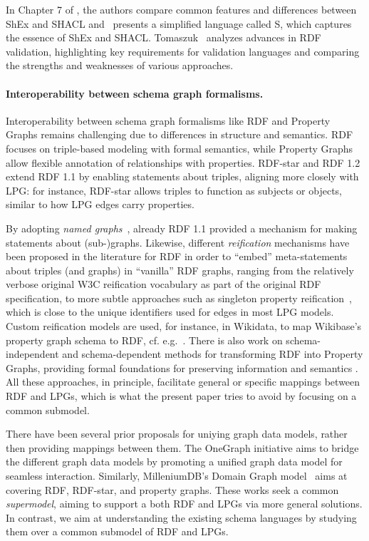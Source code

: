 In Chapter 7 of \cite{GPBK17}, the authors compare common features and differences between ShEx and SHACL and~\cite{GGFE19} presents a simplified language called S, which captures the essence of ShEx and SHACL. Tomaszuk~\cite{T17} analyzes advances in RDF validation, highlighting key requirements for validation languages and comparing the strengths and weaknesses of various approaches.

\paragraph{Interoperability between schema graph formalisms.}

Interoperability between schema graph formalisms like RDF and Property Graphs remains challenging due to differences in structure and semantics. RDF focuses on triple-based modeling with formal semantics, while Property Graphs allow flexible annotation of relationships with properties. RDF-star \cite{H14} and RDF 1.2 \cite{KCHS24} extend RDF 1.1 by enabling statements about triples, aligning more closely with LPG: for instance, RDF-star allows triples to function as subjects or objects, similar to how LPG edges carry properties.

By adopting \emph{named graphs}~\cite{CARROLL2005247}, already RDF 1.1 provided a mechanism for making statements about (sub-)graphs. Likewise, different \emph{reification} mechanisms have been proposed in the literature for RDF in order to ``embed'' meta-statements about triples (and graphs) in ``vanilla'' RDF graphs, ranging from the relatively verbose original W3C reification vocabulary as part of the original RDF specification, to more subtle approaches such as singleton property reification~\cite{NBS14}, which is close to the unique identifiers used for edges in most LPG models. Custom reification models are used, for instance, in Wikidata, to map Wikibase's property graph schema to RDF, cf. e.g.~\cite{FSAP24,HHK15}.
There is also work on  schema-independent and schema-dependent methods for transforming RDF into Property Graphs, providing formal foundations for preserving information and semantics \cite{ATT20}.
All these approaches, in principle, facilitate general or specific mappings between RDF and LPGs, which is what the present paper tries to avoid by focusing on a common submodel.

There have been several prior proposals for uniying graph data models, rather then providing mappings between them.  The OneGraph initiative \cite{LSHBBB23} aims to bridge the different graph data models by promoting a unified graph data model for seamless interaction. Similarly, MilleniumDB's Domain Graph model~\cite{DCRMD23} aims at covering RDF, RDF-star, and property graphs. These works seek a common \emph{supermodel}, aiming to support a both RDF and LPGs via more general solutions. In contrast, we aim at understanding the existing schema languages by studying them over a common submodel of RDF and LPGs.

